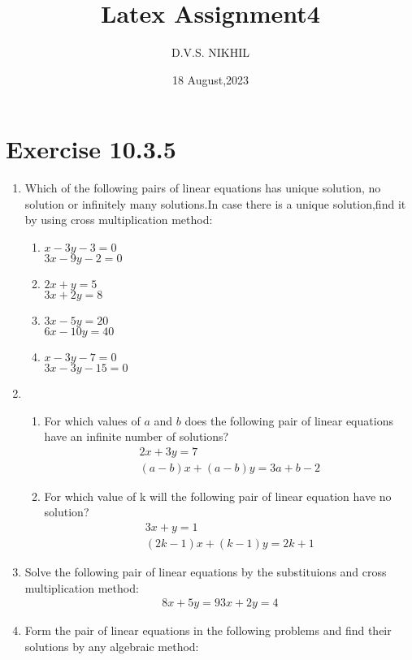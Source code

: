 \documentclass{article}
\theoremstyle{remark}
\begin{document}
\title{Latex Assignment4}
\author{D.V.S. NIKHIL}
\date{18 August,2023}
\maketitle
\section*{Exercise 10.3.5}
\begin{enumerate}
\item Which of the following pairs of linear equations has unique solution, no solution or infinitely many solutions.In case there is a unique solution,find it by using cross multiplication method:
  \begin{enumerate}[label=(\roman*)]
	\item $x-3y-3=0$\\
	$3x-9y-2=0$
	\item $2x+y=5$\\
	$3x+2y=8$
	\item $3x-5y=20$\\
	$6x-10y=40$
	\item $x-3y-7=0$\\
	$3x-3y-15=0$
  \end{enumerate}
\item 
  \begin{enumerate}[label=(\roman*)]
  \item For which values of $a$ and $b$ does the following pair of linear equations have an infinite number of solutions?
	\begin{align}
	2x+3y=7\\
	(a-b)x+(a-b)y=3a+b-2
	\end{align}
  \item For which value of k will the following pair of linear equation have no solution?
	\begin{align}
	3x+y=1\\
	(2k-1)x+(k-1)y=2k+1
	\end{align}
   \end{enumerate}
\item Solve the following pair of linear equations by the substituions and cross multiplication method:
\begin{align}
8x+5y=9
3x+2y=4
\end{align}
\item Form the pair of linear equations in the following problems and find their solutions by any algebraic method:
\begin{enumerate}[label=(\roman*)]

\end{enumerate}
\end{enumerate}
\end{document}
